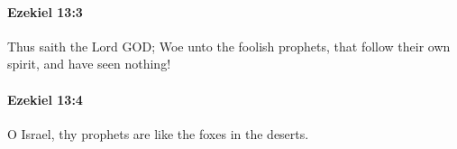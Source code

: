 		\paragraph{Ezekiel 13:3} %
			\label{EZEKIEL-13-3}

			Thus saith the Lord GOD; Woe unto the foolish prophets, that follow their own spirit, and have seen nothing!


		\paragraph{Ezekiel 13:4} %
			\label{EZEKIEL-13-4}

			O Israel, thy prophets are like the foxes in the deserts.


